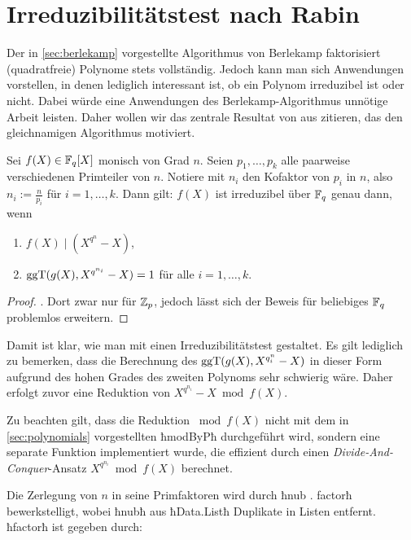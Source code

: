 \section{Irreduzibilitätstest nach Rabin}

Der in \autoref{sec:berlekamp} vorgestellte Algorithmus von Berlekamp
faktorisiert (quadratfreie) Polynome stets vollständig. Jedoch kann man sich
Anwendungen vorstellen, in denen lediglich interessant ist, ob ein Polynom
irreduzibel ist oder nicht. Dabei würde eine Anwendungen des
Berlekamp-Algorithmus unnötige Arbeit leisten. 
Daher wollen wir das zentrale Resultat von \citeauthor{rabin} aus 
\autocite{rabin} zitieren, das den gleichnamigen Algorithmus motiviert.

\begin{thm}
  \label{satz:rabin}
  Sei $f(X) \in \mathbb{F}_q[X]$ monisch von Grad $n$. Seien $p_1,\ldots,p_k$ alle
  paarweise verschiedenen Primteiler von $n$. Notiere mit $n_i$ den Kofaktor
  von $p_i$ in $n$, also $n_i := \tfrac{n}{p_i}$ für $i=1,\ldots,k$. Dann gilt:
  $f(X)$ ist irreduzibel über $\mathbb{F}_q$ genau dann, wenn
  \begin{enumerate}
    \item $f(X) \mid (X^{q^n}-X)$,
    \item $\operatorname{ggT}(g(X), X^{q^{n_i}}-X) = 1$ für alle $i=1,\ldots,k$.
  \end{enumerate}
\end{thm}
\begin{proof}
  \autocite[Lemma 1]{rabin}. Dort zwar nur für $\mathbb{Z}_p$, jedoch lässt sich der
  Beweis für beliebiges $\mathbb{F}_q$ problemlos erweitern.
\end{proof}

Damit ist klar, wie man mit  einen Irreduzibilitätstest
gestaltet. Es gilt lediglich zu bemerken, dass die Berechnung des 
$\operatorname{ggT}(g(X),X^{q^n_i}-X)$ in dieser Form aufgrund des hohen Grades des zweiten
Polynoms sehr schwierig wäre. Daher erfolgt zuvor eine Reduktion von
$X^{q^{n_i}}-X \bmod f(X)$.


Zu beachten gilt, dass die Reduktion $\bmod f(X)$ nicht mit dem in
\autoref{sec:polynomials} vorgestellten ħmodByPħ durchgeführt wird, sondern
eine separate Funktion implementiert wurde, die effizient durch einen
\emph{Divide-And-Conquer}-Ansatz $X^{q^{n_i}} \bmod f(X)$ berechnet.


Die Zerlegung von $n$ in seine Primfaktoren wird durch ħnub . factorħ
bewerkstelligt, wobei ħnubħ aus ħData.Listħ Duplikate in Listen entfernt.
ħfactorħ ist gegeben durch:

